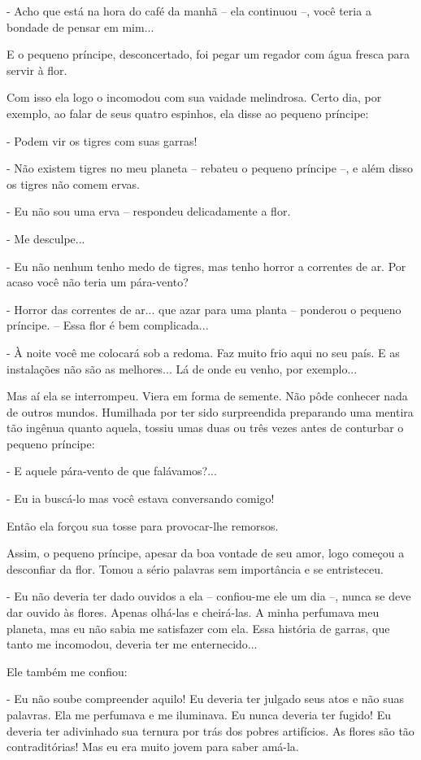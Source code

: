 - Acho que está na hora do café da manhã -- ela continuou --, você teria
a bondade de pensar em mim...

E o pequeno príncipe, desconcertado, foi pegar um regador com água
fresca para servir à flor.

Com isso ela logo o incomodou com sua vaidade melindrosa. Certo dia, por
exemplo, ao falar de seus quatro espinhos, ela disse ao pequeno
príncipe:

- Podem vir os tigres com suas garras!

- Não existem tigres no meu planeta -- rebateu o pequeno príncipe --, e
além disso os tigres não comem ervas.

- Eu não sou uma erva -- respondeu delicadamente a flor.

- Me desculpe...

- Eu não nenhum tenho medo de tigres, mas tenho horror a correntes de
ar. Por acaso você não teria um pára-vento?

- Horror das correntes de ar... que azar para uma planta -- ponderou o
pequeno príncipe. -- Essa flor é bem complicada...

- À noite você me colocará sob a redoma. Faz muito frio aqui no seu
país. E as instalações não são as melhores... Lá de onde eu venho, por
exemplo...

Mas aí ela se interrompeu. Viera em forma de semente. Não pôde conhecer
nada de outros mundos. Humilhada por ter sido surpreendida preparando
uma mentira tão ingênua quanto aquela, tossiu umas duas ou três vezes
antes de conturbar o pequeno príncipe:

- E aquele pára-vento de que falávamos?...

- Eu ia buscá-lo mas você estava conversando comigo!

Então ela forçou sua tosse para provocar-lhe remorsos.

Assim, o pequeno príncipe, apesar da boa vontade de seu amor, logo
começou a desconfiar da flor. Tomou a sério palavras sem importância e
se entristeceu.

- Eu não deveria ter dado ouvidos a ela -- confiou-me ele um dia --,
nunca se deve dar ouvido às flores. Apenas olhá-las e cheirá-las. A
minha perfumava meu planeta, mas eu não sabia me satisfazer com ela.
Essa história de garras, que tanto me incomodou, deveria ter me
enternecido...

Ele também me confiou:

- Eu não soube compreender aquilo! Eu deveria ter julgado seus atos e
não suas palavras. Ela me perfumava e me iluminava. Eu nunca deveria ter
fugido! Eu deveria ter adivinhado sua ternura por trás dos pobres
artifícios. As flores são tão contraditórias! Mas eu era muito jovem
para saber amá-la.

